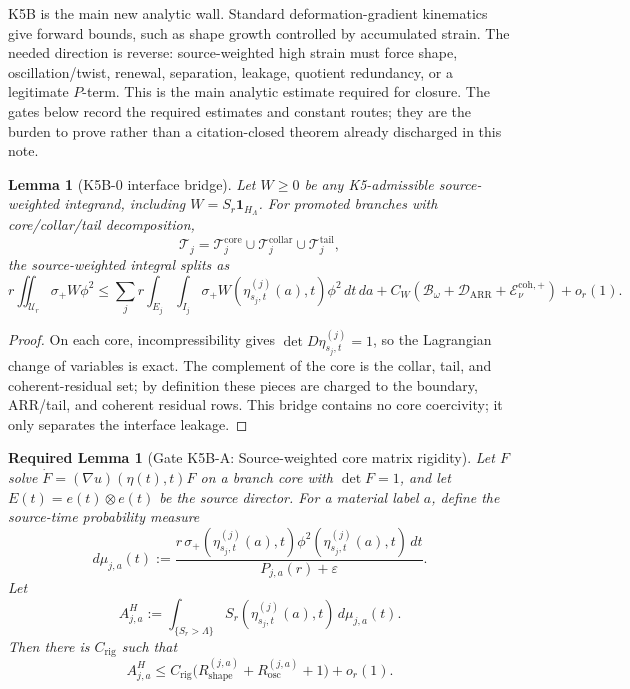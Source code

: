 \documentclass[11pt]{article}
\newtheorem{lemma}{Lemma}
\newtheorem{requiredlemma}{Required Lemma}
\begin{document}
K5B is the main new analytic wall.  Standard deformation-gradient kinematics
give forward bounds, such as shape growth controlled by accumulated strain.
The needed direction is reverse: source-weighted high strain must force shape,
oscillation/twist, renewal, separation, leakage, quotient redundancy, or a
legitimate \(P\)-term.
This is the main analytic estimate required for closure.  The gates below
record the required estimates and constant routes; they are the burden to prove
rather than a citation-closed theorem already discharged in this note.

\begin{lemma}[K5B-0 interface bridge]
\label{lem:K5B-interface}
Let \(W\ge0\) be any K5-admissible source-weighted integrand, including
\(W=S_r\mathbf 1_{H_\Lambda}\).  For promoted branches with
core/collar/tail decomposition,
\[
\mathcal T_j=\mathcal T_j^{\mathrm{core}}\cup
\mathcal T_j^{\mathrm{collar}}\cup\mathcal T_j^{\mathrm{tail}},
\]
the source-weighted integral splits as
\[
r\iint_{\mathcal U_r}\sigma_+W\phi^2
\le
\sum_j r\int_{E_j}\int_{I_j}
\sigma_+W(\eta_{s_j,t}^{(j)}(a),t)\phi^2\,dt\,da
+C_W(\mathcal B_\omega+\mathcal D_{\mathrm{ARR}}
+\mathcal E_\nu^{\mathrm{coh},+})
+o_r(1).
\]
\end{lemma}

\begin{proof}
On each core, incompressibility gives \(\det D\eta_{s_j,t}^{(j)}=1\), so the
Lagrangian change of variables is exact.  The complement of the core is the
collar, tail, and coherent-residual set; by definition these pieces are charged
to the boundary, ARR/tail, and coherent residual rows.  This bridge contains no
core coercivity; it only separates the interface leakage.
\end{proof}

\setcounter{requiredlemma}{3}
\begin{requiredlemma}[Gate K5B-A: Source-weighted core matrix rigidity]
\label{lem:K5B-path}
Let \(F\) solve \(\dot F=(\nabla u)(\eta(t),t)F\) on a branch core with
\(\det F=1\), and let \(E(t)=e(t)\otimes e(t)\) be the source director.  For a
material label \(a\), define the source-time probability measure
\[
d\mu_{j,a}(t)
:=
\frac{r\,\sigma_+(\eta_{s_j,t}^{(j)}(a),t)
\phi^2(\eta_{s_j,t}^{(j)}(a),t)\,dt}
{P_{j,a}(r)+\varepsilon}.
\]
Let
\[
A_{j,a}^H
:=
\int_{\{S_r>\Lambda\}}
S_r(\eta_{s_j,t}^{(j)}(a),t)\,d\mu_{j,a}(t).
\]
Then there is \(C_{\mathrm{rig}}\) such that
\begin{equation}
\label{eq:path-rigidity}
A_{j,a}^H
\le
C_{\mathrm{rig}}\big(
R_{\mathrm{shape}}^{(j,a)}
+R_{\mathrm{osc}}^{(j,a)}
+1\big)+o_r(1).
\end{equation}
\end{requiredlemma}
\end{document}
